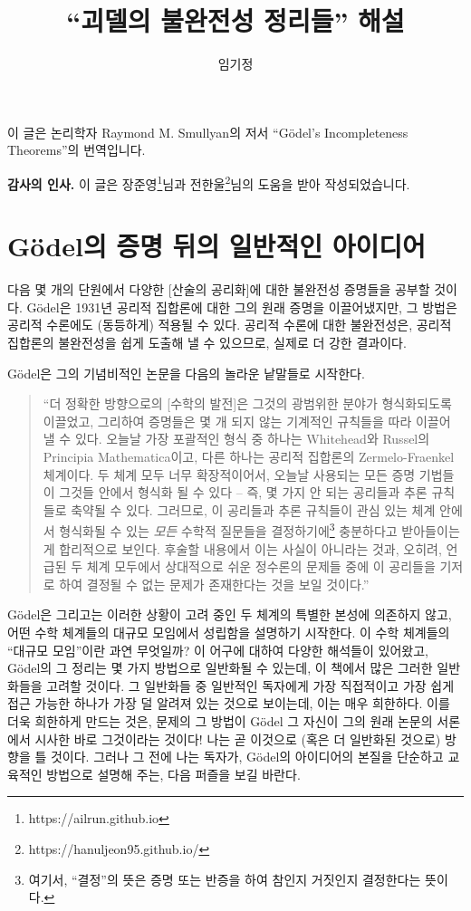 \documentclass[12pt]{paper}
\title{``괴델의 불완전성 정리들'' 해설}
\author{임기정}
\begin{document}
\maketitle

이 글은 논리학자 Raymond M. Smullyan의 저서 ``G\"odel's Incompleteness Theorems''의 번역입니다.

\textbf{감사의 인사.} 이 글은 장준영\footnote{https://ailrun.github.io}님과 전한울\footnote{https://hanuljeon95.github.io/}님의 도움을 받아 작성되었습니다.

\newpage

\section{G\"odel의 증명 뒤의 일반적인 아이디어}
\hspace{12pt}

다음 몇 개의 단원에서 다양한 [산술의 공리화]에 대한 불완전성 증명들을 공부할 것이다.
G\"odel은 1931년 공리적 집합론에 대한 그의 원래 증명을 이끌어냈지만,
그 방법은 공리적 수론에도 (동등하게) 적용될 수 있다.
공리적 수론에 대한 불완전성은,
공리적 집합론의 불완전성을 쉽게 도출해 낼 수 있으므로,
실제로 더 강한 결과이다.

G\"odel은 그의 기념비적인 논문을 다음의 놀라운 낱말들로 시작한다.

\begin{quotation}
``더 정확한 방향으로의 [수학의 발전]은 그것의 광범위한 분야가 형식화되도록 이끌었고,
그리하여 증명들은 몇 개 되지 않는 기계적인 규칙들을 따라 이끌어 낼 수 있다.
오늘날 가장 포괄적인 형식 중 하나는 Whitehead와 Russel의 Principia Mathematica이고,
다른 하나는 공리적 집합론의 Zermelo-Fraenkel 체계이다.
두 체계 모두 너무 확장적이어서,
오늘날 사용되는 모든 증명 기법들이 그것들 안에서 형식화 될 수 있다 --
즉, 몇 가지 안 되는 공리들과 추론 규칙들로 축약될 수 있다.
그러므로, 이 공리들과 추론 규칙들이 관심 있는 체계 안에서 형식화될 수 있는 \textit{모든} 수학적 질문들을 결정하기에\footnote
{
여기서, ``결정''의 뜻은 증명 또는 반증을 하여 참인지 거짓인지 결정한다는 뜻이다.
}
충분하다고 받아들이는 게 합리적으로 보인다.
후술할 내용에서 이는 사실이 아니라는 것과,
오히려, 언급된 두 체계 모두에서 상대적으로 쉬운 정수론의 문제들 중에 이 공리들을 기저로 하여 결정될 수 없는 문제가 존재한다는 것을 보일 것이다.''
\end{quotation}

G\"odel은 그리고는 이러한 상황이 고려 중인 두 체계의 특별한 본성에 의존하지 않고,
어떤 수학 체계들의 대규모 모임에서 성립함을 설명하기 시작한다.
이 수학 체계들의 ``대규모 모임''이란 과연 무엇일까?
이 어구에 대하여 다양한 해석들이 있어왔고,
G\"odel의 그 정리는 몇 가지 방법으로 일반화될 수 있는데,
이 책에서 많은 그러한 일반화들을 고려할 것이다.
그 일반화들 중 일반적인 독자에게 가장 직접적이고 가장 쉽게 접근 가능한 하나가 가장 덜 알려져 있는 것으로 보이는데,
이는 매우 희한하다.
이를 더욱 희한하게 만드는 것은,
문제의 그 방법이 G\"odel 그 자신이 그의 원래 논문의 서론에서 시사한 바로 그것이라는 것이다!
나는 곧 이것으로 (혹은 더 일반화된 것으로) 방향을 틀 것이다.
그러나 그 전에 나는 독자가,
G\"odel의 아이디어의 본질을 단순하고 교육적인 방법으로 설명해 주는,
다음 퍼즐을 보길 바란다.
\end{document}
